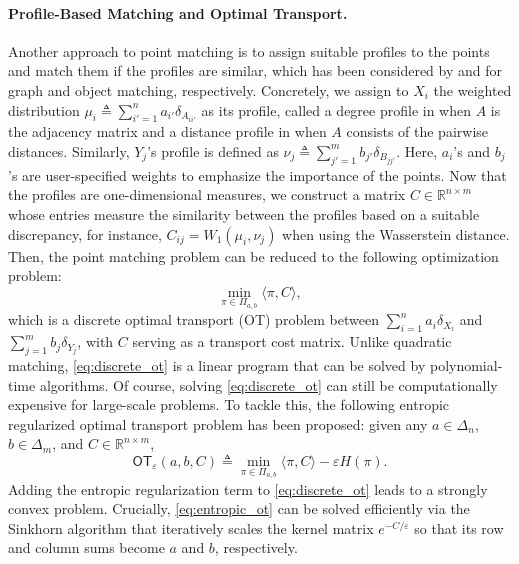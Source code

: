 \documentclass{article}
\theoremstyle{definition}
\newcommand{\R}{\mathbb{R}}
\renewcommand{\epsilon}{\varepsilon}
\begin{document}
\paragraph{Profile-Based Matching and Optimal Transport.}
Another approach to point matching is to assign suitable profiles to the points and match them if the profiles are similar, which has been considered by \cite{ding2021efficient} and \cite{hur2025robust} for graph and object matching, respectively. Concretely, we assign to $X_i$ the weighted distribution $\mu_i \triangleq \sum_{i' = 1}^{n} a_{i'} \delta_{A_{i i'}}$ as its profile, called a degree profile in \cite{ding2021efficient} when $A$ is the adjacency matrix and a distance profile in \cite{hur2025robust} when $A$ consists of the pairwise distances. Similarly, $Y_j$'s profile is defined as $\nu_j \triangleq \sum_{j' = 1}^{m} b_{j'} \delta_{B_{j j'}}$. Here, $a_i$'s and $b_j$'s are user-specified weights to emphasize the importance of the points. Now that the profiles are one-dimensional measures, we construct a matrix $C \in \R^{n \times m}$ whose entries measure the similarity between the profiles based on a suitable discrepancy, for instance, $C_{i j} = W_1(\mu_i, \nu_j)$ when using the Wasserstein distance. Then, the point matching problem can be reduced to the following optimization problem:
\begin{equation}
    \label{eq:discrete_ot}
    \min_{\pi \in \Pi_{a, b}} \langle \pi, C \rangle,
\end{equation}
which is a discrete optimal transport (OT) problem between $\sum_{i = 1}^{n} a_i \delta_{X_i}$ and $\sum_{j = 1}^{m} b_j \delta_{Y_j}$, with $C$ serving as a transport cost matrix. Unlike quadratic matching, \eqref{eq:discrete_ot} is a linear program that can be solved by polynomial-time algorithms. Of course, solving \eqref{eq:discrete_ot} can still be computationally expensive for large-scale problems. To tackle this, the following entropic regularized optimal transport problem \cite{wilson1969use,cuturi2013sinkhorn,peyre2019computational} has been proposed: given any $a \in \Delta_n$, $b \in \Delta_m$, and $C \in \R^{n \times m}$, 
\begin{equation}
    \label{eq:entropic_ot}
    \mathsf{OT}_{\epsilon}(a, b, C) \triangleq \min_{\pi \in \Pi_{a, b}} \langle \pi, C \rangle -\epsilon H(\pi).
\end{equation}
Adding the entropic regularization term to \eqref{eq:discrete_ot} leads to a strongly convex problem. Crucially, \eqref{eq:entropic_ot} can be solved efficiently via the Sinkhorn algorithm that iteratively scales the kernel matrix $e^{-C / \epsilon}$ so that its row and column sums become $a$ and $b$, respectively.
\end{document}
